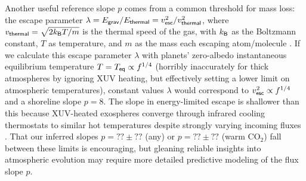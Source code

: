 \documentclass[modern,linenumbers,trackchanges]{aastex7}
\begin{document}
Another useful reference slope $p$ comes from a common threshold for mass loss: the escape parameter $\lambda = E_{\sf grav}/E_{\sf thermal} = v_{\sf esc}^2/v_{\sf thermal}^2$, where $v_{\sf thermal} = \sqrt{2k_{\sf B} T/m}$  is the thermal speed of the gas, with $k_{\sf B}$ as the Boltzmann constant, $T$ as temperature, and $m$ as the mass each escaping atom/molecule \citep[see][]{schallerVolatileLossRetention2007, johnsonExospheresAtmosphericEscape2008, gronoffAtmosphericEscapeProcesses2020}. If we calculate this escape parameter $\lambda$ with planets' zero-albedo instantaneous equilibrium temperature $T = T_{\sf eq}  \propto f^{1/4}$ (horribly inaccurately for thick atmospheres by ignoring XUV heating, but effectively setting a lower limit on atmospheric temperatures), constant values $\lambda$ would correspond to $v_{\sf esc}^2 \propto f^{1/4}$ and a shoreline slope $p=8$. The slope in energy-limited escape is  shallower than this because XUV-heated exospheres converge through infrared cooling thermostats to similar hot temperatures despite strongly varying incoming fluxes \citep{chamberlainUpperAtmospheresPlanets1962, murray-clayAtmosphericEscapeHot2009, chatterjeeNovelPhysicsEscaping2024}. That our inferred slopes $p=??\pm??$ (any) or $p=??\pm??$ (warm CO$_2$) fall between these limits is encouraging, but gleaning reliable insights into atmospheric evolution may require more detailed predictive modeling of the flux slope $p$. 
\end{document}
